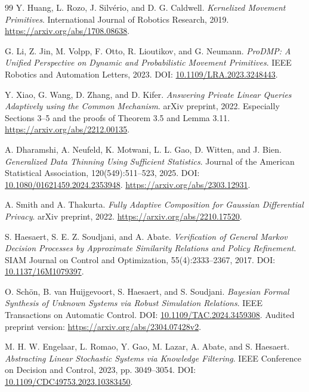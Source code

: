 \documentclass[UTF8,fontset=fandol,11pt,a4paper]{ctexart}
\theoremstyle{definition}
\theoremstyle{remark}
\numberwithin{equation}{section}
\begin{document}
\clearpage
\begin{thebibliography}{99}
\small
{} Y. Huang, L. Rozo, J. Silvério, and D. G. Caldwell.
\emph{Kernelized Movement Primitives}. International Journal of Robotics Research, 2019.
\url{https://arxiv.org/abs/1708.08638}.

 G. Li, Z. Jin, M. Volpp, F. Otto, R. Lioutikov, and G. Neumann.
\emph{ProDMP: A Unified Perspective on Dynamic and Probabilistic Movement Primitives}.
IEEE Robotics and Automation Letters, 2023. DOI: \href{https://doi.org/10.1109/LRA.2023.3248443}{10.1109/LRA.2023.3248443}.

 Y. Xiao, G. Wang, D. Zhang, and D. Kifer.
\emph{Answering Private Linear Queries Adaptively using the Common Mechanism}.
arXiv preprint, 2022. Especially Sections 3--5 and the proofs of Theorem 3.5 and Lemma 3.11.
\url{https://arxiv.org/abs/2212.00135}.

 A. Dharamshi, A. Neufeld, K. Motwani, L. L. Gao, D. Witten, and J. Bien.
\emph{Generalized Data Thinning Using Sufficient Statistics}.
Journal of the American Statistical Association, 120(549):511--523, 2025.
DOI: \href{https://doi.org/10.1080/01621459.2024.2353948}{10.1080/01621459.2024.2353948}.
\url{https://arxiv.org/abs/2303.12931}.

 A. Smith and A. Thakurta.
\emph{Fully Adaptive Composition for Gaussian Differential Privacy}.
arXiv preprint, 2022. \url{https://arxiv.org/abs/2210.17520}.

 S. Haesaert, S. E. Z. Soudjani, and A. Abate.
\emph{Verification of General Markov Decision Processes by Approximate Similarity Relations and Policy Refinement}.
SIAM Journal on Control and Optimization, 55(4):2333--2367, 2017.
DOI: \href{https://doi.org/10.1137/16M1079397}{10.1137/16M1079397}.

 O. Schön, B. van Huijgevoort, S. Haesaert, and S. Soudjani.
\emph{Bayesian Formal Synthesis of Unknown Systems via Robust Simulation Relations}.
IEEE Transactions on Automatic Control. DOI: \href{https://doi.org/10.1109/TAC.2024.3459308}{10.1109/TAC.2024.3459308}.
Audited preprint version: \url{https://arxiv.org/abs/2304.07428v2}.

 M. H. W. Engelaar, L. Romao, Y. Gao, M. Lazar, A. Abate, and S. Haesaert.
\emph{Abstracting Linear Stochastic Systems via Knowledge Filtering}.
IEEE Conference on Decision and Control, 2023, pp. 3049--3054.
DOI: \href{https://doi.org/10.1109/CDC49753.2023.10383450}{10.1109/CDC49753.2023.10383450}.


\end{thebibliography}
\end{document}
